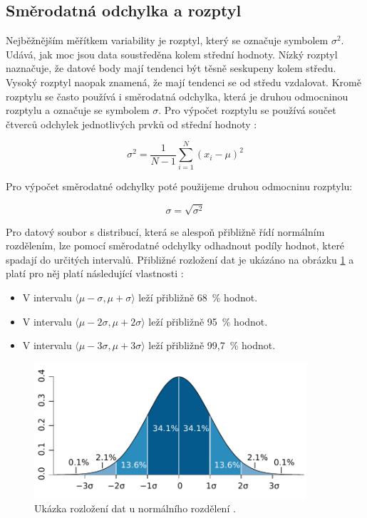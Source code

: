 \subsection*{Směrodatná odchylka a rozptyl}
Nejběžnějším měřítkem variability je rozptyl, který se označuje symbolem $\sigma^2$. Udává, jak moc jsou data soustředěna kolem střední hodnoty. Nízký rozptyl naznačuje, že datové body mají tendenci být těsně seskupeny kolem středu. Vysoký rozptyl naopak znamená, že mají tendenci se od středu vzdalovat. Kromě rozptylu se často používá i směrodatná odchylka, která je druhou odmocninou rozptylu a označuje se symbolem $\sigma$. Pro výpočet rozptylu se používá součet čtverců odchylek jednotlivých prvků od střední hodnoty \cite{frost}:

\begin{equation}
    \sigma^2 = \frac{1}{N-1} \sum_{i=1}^{N} (x_i - \mu)^2
\end{equation}

\noindent Pro výpočet směrodatné odchylky poté použijeme druhou odmocninu rozptylu:

\begin{equation}
    \sigma = \sqrt{\sigma^2}
\end{equation}

\medskip

\noindent Pro datový soubor s distribucí, která se alespoň přibližně řídí normálním rozdělením, lze pomocí směrodatné odchylky odhadnout podíly hodnot, které spadají do určitých intervalů. Přibližné rozložení dat je ukázáno na obrázku \ref{fig:normal_distribution} a platí pro něj platí následující vlastnosti \cite{frost}:

\begin{itemize}
    \item V intervalu $\langle{\mu-\sigma,\mu+\sigma}\rangle$ leží přibližně 68~\% hodnot.
    \item V intervalu $\langle{\mu-2\sigma,\mu+2\sigma}\rangle$ leží přibližně 95~\% hodnot.
    \item V intervalu $\langle{\mu-3\sigma,\mu+3\sigma}\rangle$ leží přibližně 99,7~\% hodnot.
\end{itemize}

\begin{figure}[H]
	\centering
	\includegraphics[width=0.9\textwidth]{obrazky-figures/normal_distribution.pdf}
	\caption{Ukázka rozložení dat u normálního rozdělení \cite{normal_distribution}.}
	\label{fig:normal_distribution}
\end{figure}


